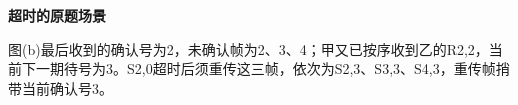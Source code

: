 {\color{ink}\bfseries 超时的原题场景}\par\vspace{1bp}图(b)最后收到的确认号为2，未确认帧为2、3、4；甲又已按序收到乙的R2,\allowbreak{}2，当前下一期待号为3。S2,\allowbreak{}0超时后须重传这三帧，依次为S2,\allowbreak{}3、S3,\allowbreak{}3、S4,\allowbreak{}3，重传帧捎带当前确认号3。
